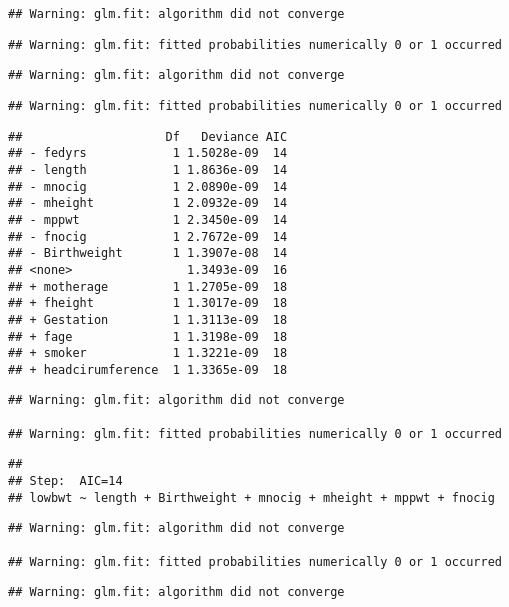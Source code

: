 \documentclass[]{article}
\begin{document}
\begin{verbatim}
## Warning: glm.fit: algorithm did not converge
\end{verbatim}

\begin{verbatim}
## Warning: glm.fit: fitted probabilities numerically 0 or 1 occurred
\end{verbatim}

\begin{verbatim}
## Warning: glm.fit: algorithm did not converge
\end{verbatim}

\begin{verbatim}
## Warning: glm.fit: fitted probabilities numerically 0 or 1 occurred
\end{verbatim}

\begin{verbatim}
##                    Df   Deviance AIC
## - fedyrs            1 1.5028e-09  14
## - length            1 1.8636e-09  14
## - mnocig            1 2.0890e-09  14
## - mheight           1 2.0932e-09  14
## - mppwt             1 2.3450e-09  14
## - fnocig            1 2.7672e-09  14
## - Birthweight       1 1.3907e-08  14
## <none>                1.3493e-09  16
## + motherage         1 1.2705e-09  18
## + fheight           1 1.3017e-09  18
## + Gestation         1 1.3113e-09  18
## + fage              1 1.3198e-09  18
## + smoker            1 1.3221e-09  18
## + headcirumference  1 1.3365e-09  18
\end{verbatim}

\begin{verbatim}
## Warning: glm.fit: algorithm did not converge

## Warning: glm.fit: fitted probabilities numerically 0 or 1 occurred
\end{verbatim}

\begin{verbatim}
## 
## Step:  AIC=14
## lowbwt ~ length + Birthweight + mnocig + mheight + mppwt + fnocig
\end{verbatim}

\begin{verbatim}
## Warning: glm.fit: algorithm did not converge

## Warning: glm.fit: fitted probabilities numerically 0 or 1 occurred
\end{verbatim}

\begin{verbatim}
## Warning: glm.fit: algorithm did not converge
\end{verbatim}
\end{document}
